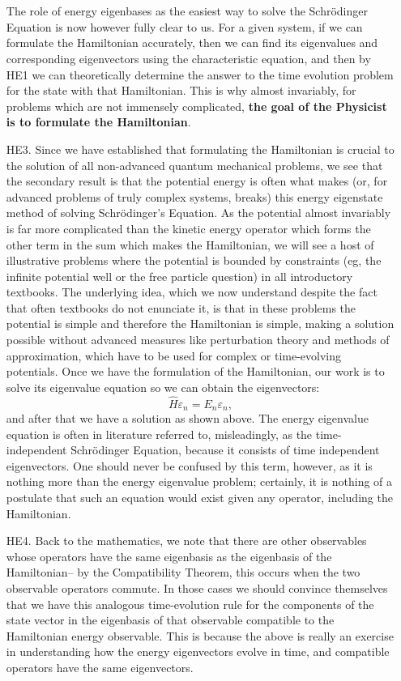 \begin{enumerate}
    \\\\
    The role of energy eigenbases as the easiest way to solve the Schr\"{o}dinger Equation is now however fully clear to us. For a given system, if we can formulate the Hamiltonian accurately, then we can find its eigenvalues and corresponding eigenvectors using the characteristic equation, and then by HE1 we can theoretically determine the answer to the time evolution problem for the state with that Hamiltonian. This is why almost invariably, for problems which are not immensely complicated, \textbf{the goal of the Physicist is to formulate the Hamiltonian}. 
    \item[HE3.] Since we have established that formulating the Hamiltonian is crucial to the solution of all non-advanced quantum mechanical problems, we see that the secondary result is that the potential energy is often what makes (or, for advanced problems of truly complex systems, breaks) this energy eigenstate method of solving Schr\"{o}dinger's Equation. As the potential almost invariably is far more complicated than the kinetic energy operator which forms the other term in the sum which makes the Hamiltonian, we will see a host of illustrative problems where the potential is bounded by constraints (eg, the infinite potential well or the free particle question) in all introductory textbooks. The underlying idea, which we now understand despite the fact that often textbooks do not enunciate it, is that in these problems the potential is simple and therefore the Hamiltonian is simple, making a solution possible without advanced measures like perturbation theory and methods of approximation, which have to be used for complex or time-evolving potentials. Once we have the formulation of the Hamiltonian, our work is to solve its eigenvalue equation so we can obtain the eigenvectors:
    $$
    \hat{H}\varepsilon_{n}=E_{n}\varepsilon_{n},
    $$
    and after that we have a solution as shown above. The energy eigenvalue equation is often in literature referred to, misleadingly, as the time-independent Schr\"{o}dinger Equation, because it consists of time independent eigenvectors. One should never be confused by this term, however, as it is nothing more than the energy eigenvalue problem; certainly, it is nothing of a postulate that such an equation would exist given any operator, including the Hamiltonian.
    \item[HE4.] Back to the mathematics, we note that there are other observables whose operators have the same eigenbasis as the eigenbasis of the Hamiltonian-- by the Compatibility Theorem, this occurs when the two observable operators commute. In those cases we should convince themselves that we have this analogous time-evolution rule for the components of the state vector in the eigenbasis of that observable compatible to the Hamiltonian energy observable. This is because the above is really an exercise in understanding how the energy eigenvectors evolve in time, and compatible operators have the same eigenvectors.

\end{enumerate}
